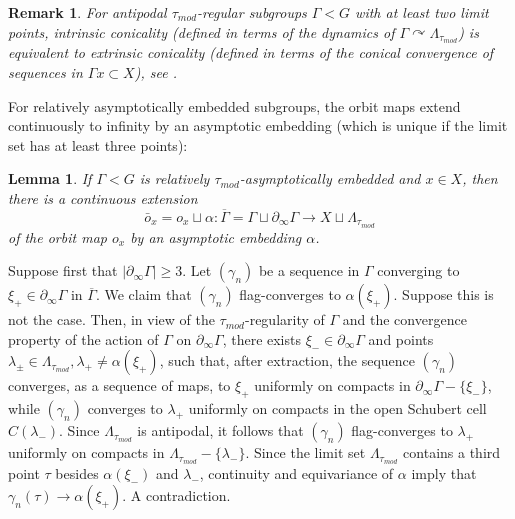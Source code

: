 \documentclass[12pt]{article}
\theoremstyle{boldplain}
\newtheorem{lemma}[equation]{Lemma}
\theoremstyle{bolddefinition}
\newtheorem{rem}[equation]{Remark}
\numberwithin{equation}{section}
\def\al{\alpha}
\def\ga{\gamma}
\def\Ga{\Gamma}
\def\la{\lambda}
\def\La{\Lambda}
\def\acts{\curvearrowright}
\def\geo{\partial_{\infty}}
\def\Lat{\La_{\tau_{mod}}}
\def\lra{\longrightarrow}
\def\ol{\overline}
\def\taumod{\tau_{mod}}
\def\mini{\scriptsize}
\begin{document}
\begin{rem}
For  antipodal $\taumod$-regular subgroups $\Ga< G$ with at least two limit points,  
intrinsic conicality (defined in terms of the dynamics of $\Ga\acts \Lat$) 
is equivalent to {\em extrinsic conicality}
(defined in terms of the conical convergence of sequences in $\Ga x\subset X$), see \cite[Proposition 5.41 and Lemma 5.38]{anolec}. 
\end{rem}

For relatively asymptotically embedded subgroups,
the orbit maps extend continuously to infinity by an asymptotic embedding
(which is unique if the limit set has at least three points):
\begin{lemma}
\label{lem:cont}
If $\Ga< G$  is relatively $\taumod$-asymptotically embedded and $x\in X$,
then there is a continuous extension 
$$ \bar o_x = o_x\sqcup\al : \ol\Ga=\Ga\sqcup\geo\Ga\lra X\sqcup \Lat$$
of the orbit map $o_x$ by an asymptotic embedding $\al$.
\end{lemma} 
\proof 
Suppose first  that $|\geo \Ga|\ge 3$. 
Let $(\ga_n)$ be a sequence in $\Ga$ converging to $\xi_+\in \geo \Ga$ in $\ol{\Ga}$. {We claim that 
$(\ga_n)$ flag-converges to $\al(\xi_+)$. Suppose this is not the case. Then, in view of the $\taumod$-regularity of $\Ga$ and the convergence property of 
the action of $\Ga$ on $\geo \Ga$, there exists $\xi_-\in \geo \Ga$ and points $\la_{\pm}\in\Lat, \la_+\ne \al(\xi_+)$, such that, 
after extraction, the sequence $(\ga_n)$ converges, as a sequence of maps, 
to $\xi_+$ uniformly on compacts in $\geo \Ga - \{\xi_-\}$, while $(\ga_n)$ converges to $\la_+$ uniformly on compacts in the open Schubert cell 
$C(\la_-)$. Since $\Lat$ is antipodal, it follows that $(\ga_n)$  flag-converges to $\la_+$ 
uniformly on compacts in $\Lat -\{\la_-\}$. Since the limit set $\Lat$ contains a third point $\tau$ besides 
 $\al(\xi_-)$ and $\la_-$, continuity and equivariance of $\al$ imply that $\ga_n(\tau)\to  \al(\xi_+)$. A contradiction. }

\end{document}
